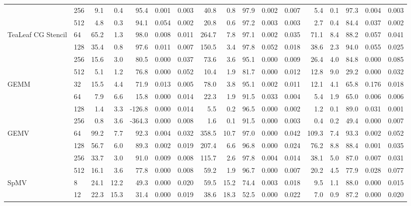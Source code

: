 \begin{table}[htbp]
\begin{tabular}{llrrrrrrrrrrrrrrr}
 & 256 & 9.1 & 0.4 & 95.4 & 0.001 & 0.003 & 40.8 & 0.8 & 97.9 & 0.002 & 0.007 & 5.4 & 0.1 & 97.3 & 0.004 & 0.003 \\
 & 512 & 4.8 & 0.3 & 94.1 & 0.054 & 0.002 & 20.8 & 0.6 & 97.2 & 0.003 & 0.003 & 2.7 & 0.4 & 84.4 & 0.037 & 0.002 \\
\midrule
\multirow{4}{*}{TeaLeaf CG Stencil} & 64 & 65.2 & 1.3 & 98.0 & 0.008 & 0.011 & 264.7 & 7.8 & 97.1 & 0.002 & 0.035 & 71.1 & 8.4 & 88.2 & 0.057 & 0.041 \\
 & 128 & 35.4 & 0.8 & 97.6 & 0.011 & 0.007 & 150.5 & 3.4 & 97.8 & 0.052 & 0.018 & 38.6 & 2.3 & 94.0 & 0.055 & 0.025 \\
 & 256 & 15.6 & 3.0 & 80.5 & 0.000 & 0.037 & 73.6 & 3.6 & 95.1 & 0.000 & 0.009 & 26.4 & 4.0 & 84.8 & 0.000 & 0.085 \\
 & 512 & 5.1 & 1.2 & 76.8 & 0.000 & 0.052 & 10.4 & 1.9 & 81.7 & 0.000 & 0.012 & 12.8 & 9.0 & 29.2 & 0.000 & 0.032 \\
\midrule
\multirow{4}{*}{GEMM} & 32 & 15.5 & 4.4 & 71.9 & 0.013 & 0.005 & 78.0 & 3.8 & 95.1 & 0.002 & 0.011 & 12.1 & 4.1 & 65.8 & 0.176 & 0.018 \\
 & 64 & 7.9 & 6.6 & 15.8 & 0.000 & 0.014 & 22.3 & 1.9 & 91.5 & 0.033 & 0.004 & 5.4 & 1.9 & 65.0 & 0.006 & 0.006 \\
 & 128 & 1.4 & 3.3 & -126.8 & 0.000 & 0.014 & 5.5 & 0.2 & 96.5 & 0.000 & 0.002 & 1.2 & 0.1 & 89.0 & 0.031 & 0.001 \\
 & 256 & 0.8 & 3.6 & -364.3 & 0.000 & 0.008 & 1.6 & 0.1 & 91.5 & 0.000 & 0.003 & 0.4 & 0.2 & 49.4 & 0.000 & 0.007 \\
\midrule
\multirow{4}{*}{GEMV} & 64 & 99.2 & 7.7 & 92.3 & 0.004 & 0.032 & 358.5 & 10.7 & 97.0 & 0.000 & 0.042 & 109.3 & 7.4 & 93.3 & 0.002 & 0.052 \\
 & 128 & 56.7 & 6.0 & 89.3 & 0.002 & 0.019 & 207.4 & 6.6 & 96.8 & 0.000 & 0.024 & 76.2 & 8.8 & 88.4 & 0.001 & 0.035 \\
 & 256 & 33.7 & 3.0 & 91.0 & 0.009 & 0.008 & 115.7 & 2.6 & 97.8 & 0.004 & 0.014 & 38.1 & 5.0 & 87.0 & 0.007 & 0.031 \\
 & 512 & 16.1 & 3.6 & 77.8 & 0.000 & 0.008 & 59.2 & 1.9 & 96.7 & 0.000 & 0.007 & 20.2 & 4.5 & 77.9 & 0.028 & 0.077 \\
\midrule
\multirow{4}{*}{SpMV} & 8 & 24.1 & 12.2 & 49.3 & 0.000 & 0.020 & 59.5 & 15.2 & 74.4 & 0.003 & 0.018 & 9.5 & 1.1 & 88.0 & 0.000 & 0.015 \\
 & 12 & 22.3 & 15.3 & 31.4 & 0.000 & 0.019 & 38.6 & 18.3 & 52.5 & 0.000 & 0.022 & 7.0 & 0.9 & 87.2 & 0.000 & 0.020 \\

\end{tabular}
\end{table}
